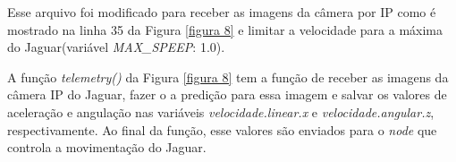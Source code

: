 Esse arquivo foi modificado para receber as imagens da câmera por IP como é mostrado na linha 35 da Figura \ref{figura 8} e limitar a velocidade para a máxima do Jaguar(variável \textit{MAX\_SPEEP}: 1.0).

\begin{figure}[H]
	\centering
\end{figure}

A função \textit{telemetry()} da Figura \ref{figura 8} tem a função de receber as imagens da câmera IP do Jaguar, fazer o a predição para essa imagem e salvar os valores de aceleração e angulação nas variáveis \textit{velocidade.linear.x} e \textit{velocidade.angular.z}, respectivamente. Ao final da função, esse valores são enviados para o \textit{node} que controla a movimentação do Jaguar.